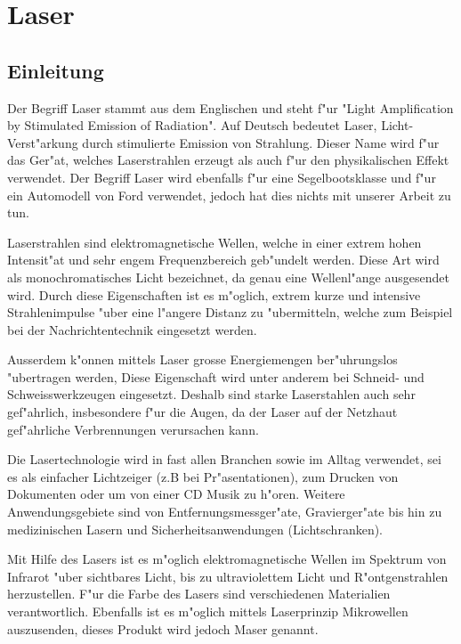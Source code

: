 \chapter{Laser\label{chapter:laser}}
\begin{refsection}


\section{Einleitung}

Der Begriff Laser stammt aus dem Englischen und steht f"ur 
"{}Light Amplification by Stimulated Emission of Radiation"{}.
Auf Deutsch bedeutet Laser, Licht-Verst"arkung durch stimulierte Emission 
von Strahlung. Dieser Name wird f"ur das Ger"at, welches Laserstrahlen erzeugt 
als auch f"ur den physikalischen Effekt verwendet. Der Begriff Laser wird
ebenfalls f"ur eine Segelbootsklasse und f"ur ein Automodell von Ford
verwendet,
jedoch hat dies nichts mit unserer Arbeit zu tun.

Laserstrahlen sind elektromagnetische Wellen,
welche in einer extrem hohen Intensit"at und sehr engem
Frequenzbereich geb"undelt werden. Diese Art wird als monochromatisches
Licht bezeichnet, da genau eine Wellenl"ange ausgesendet wird. 
Durch diese Eigenschaften ist es m"oglich, extrem kurze und
intensive Strahlenimpulse "uber eine l"angere Distanz zu "ubermitteln,
welche zum Beispiel bei der Nachrichtentechnik eingesetzt werden.

Ausserdem k"onnen mittels Laser grosse Energiemengen ber"uhrungslos
"ubertragen werden, Diese Eigenschaft wird unter anderem bei Schneid-
und Schweisswerkzeugen eingesetzt. Deshalb sind starke Laserstahlen auch 
sehr gef"ahrlich, insbesondere f"ur die Augen, da der Laser auf der Netzhaut
gef"ahrliche Verbrennungen verursachen kann.

Die Lasertechnologie wird in fast allen Branchen sowie im Alltag verwendet, 
sei es als einfacher Lichtzeiger (z.B bei Pr"asentationen),
zum Drucken von Dokumenten oder um von einer CD Musik zu h"oren. 
Weitere Anwendungsgebiete sind von Entfernungsmessger"ate, 
Gravierger"ate bis hin zu medizinischen Lasern und Sicherheitsanwendungen
(Lichtschranken).

Mit Hilfe des Lasers ist es m"oglich elektromagnetische Wellen im Spektrum
von Infrarot "uber sichtbares Licht, bis zu ultraviolettem Licht und 
R"ontgenstrahlen herzustellen. F"ur die Farbe des Lasers sind 
verschiedenen Materialien verantwortlich. Ebenfalls ist es m"oglich mittels 
Laserprinzip Mikrowellen auszusenden, dieses Produkt wird jedoch Maser genannt.
%


\end{refsection}
